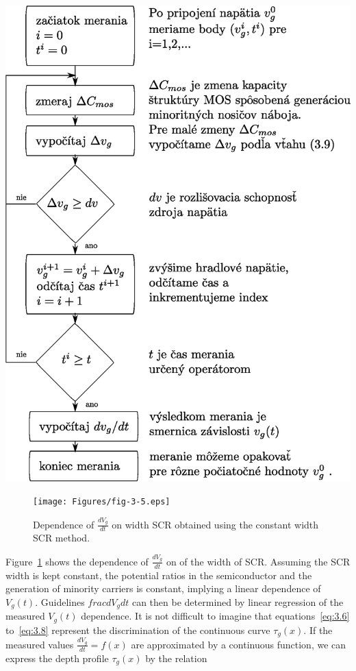 \begin{diagram}
  \includegraphics[scale=0.55,keepaspectratio]{Figures/diagram-2.EPS}\label{diagram:2}
\end{diagram}

\begin{figure}[h!]\centering
  \texttt{[image: Figures/fig-3-5.eps]}
  \caption[Dependence of $\frac{dV_g}{dt}$ on SCR width obtained by
    constant SCR width method]{Dependence of $\frac{dV_g}{dt}$ on width
    SCR obtained using the constant width SCR method.}\label{fig:3.5}
\end{figure}

Figure~\ref{fig:3.5} shows the dependence of $\frac{dV_g}{dt}$ on
of the width of SCR\@. Assuming the SCR width is kept constant, the
potential ratios in the semiconductor and the generation of minority carriers is
constant, implying a linear dependence of $V_g(t)$.  Guidelines
${frac{dV_g}{dt}}$ can then be determined by linear regression of the measured
$V_g(t)$ dependence. It is not difficult to imagine that
equations~\ref{eq:3.6} to~\ref{eq:3.8} represent the discrimination
of the continuous curve $\tau_g(x)$. If the measured values
$\frac{dV_g}{dt}=f(x)$ are approximated by a continuous function, we can express
the depth profile $\tau_g(x)$ by the relation

